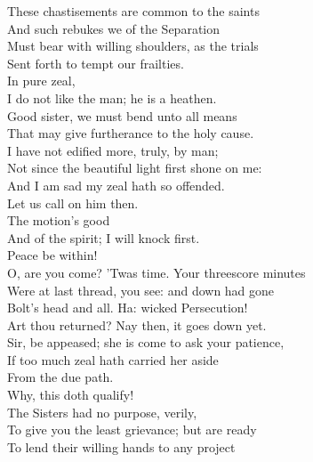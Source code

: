 \documentclass[a4paper,oneside,12pt]{memoir}
\begin{document}
\begin{drama*}
\tribulationspeaks These chastisements are common to the saints\\
And such rebukes we of the Separation\\
Must bear with willing shoulders, as the trials\\
Sent forth to tempt our frailties.\\
\persecutionspeaks {} In pure zeal,\\
I do not like the man; he is a heathen.\\
\tribulationspeaks Good sister, we must bend unto all means\\
That may give furtherance to the holy cause.\\
\persecutionspeaks I have not edified more, truly, by man;\\
Not since the beautiful light first shone on me:\\
And I am sad my zeal hath so offended.\\
\tribulationspeaks Let us call on him then.\\
\persecutionspeaks {} The motion's good\\
And of the spirit; I will knock first.\\
 Peace be within!\\
\subtlespeaks O, are you come? 'Twas time. Your threescore minutes\\
Were at last thread, you see: and down had gone\\
Bolt's head and all. Ha: wicked Persecution!\\
Art thou returned? Nay then, it goes down yet.\\
\tribulationspeaks Sir, be appeased; she is come to ask your patience,\\
If too much zeal hath carried her aside\\
From the due path.\\
\subtlespeaks {} Why, this doth qualify!\\
\tribulationspeaks The Sisters had no purpose, verily,\\
To give you the least grievance; but are ready\\
To lend their willing hands to any project\\

\end{drama*}
\end{document}
